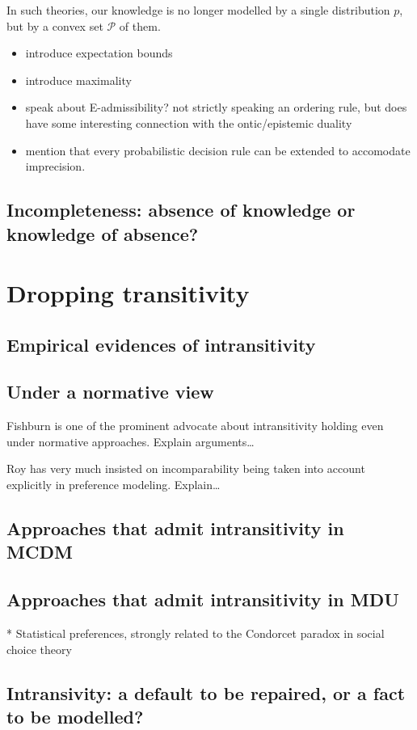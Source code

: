 \documentclass[french, english]{llncs}
\begin{document}
	In such theories, our knowledge is no longer modelled by a single distribution $p$, but by a convex set $\mathcal{P}$ of them. 
	
	\begin{itemize}
		\item introduce expectation bounds
		\item introduce maximality
		\item speak about E-admissibility? not strictly speaking an ordering rule, but does have some interesting connection with the ontic/epistemic duality
		\item mention that every probabilistic decision rule can be extended to accomodate imprecision. 
	\end{itemize}
	
    
	
	\subsection{Incompleteness: absence of knowledge or knowledge of absence?}
	
	\section{Dropping transitivity}
	
	\subsection{Empirical evidences of intransitivity}
	
	\subsection{Under a normative view}
	Fishburn is one of the prominent advocate about intransitivity holding even under normative approaches. Explain arguments…
	
	Roy has very much insisted on incomparability being taken into account explicitly in preference modeling. Explain…
	
	\subsection{Approaches that admit intransitivity in MCDM}
	
	\subsection{Approaches that admit intransitivity in MDU}
	
	* Statistical preferences, strongly related to the Condorcet paradox in social choice theory
	
	\subsection{Intransivity: a default to be repaired, or a fact to be modelled?}
	
\end{document}
